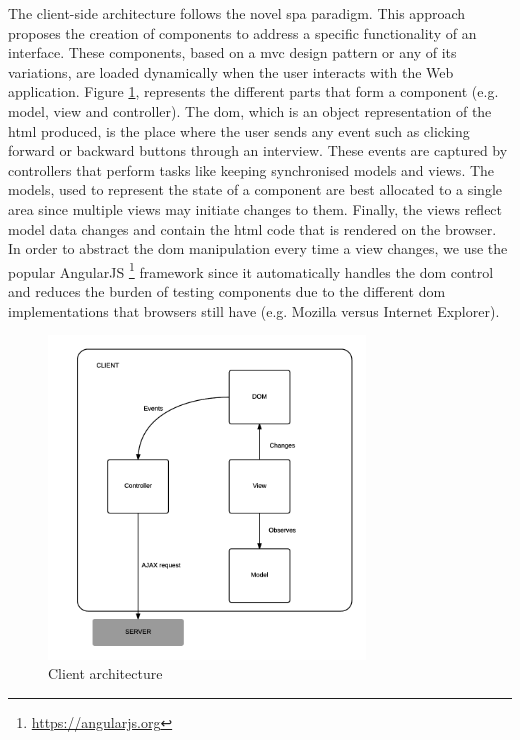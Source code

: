 	The client-side architecture follows the novel \gls{spa} paradigm. This approach proposes the creation of components to address a specific functionality of an interface. These components, based on a \gls{mvc} design pattern or any of its variations, are loaded dynamically when the user interacts with the Web application. Figure \ref{fig:design:ClientArchitecture}, represents the different parts that form a component (e.g. model, view and controller). The \gls{dom}, which is an object representation of the \gls{html} produced, is the place where the user sends any event such as clicking forward or backward buttons through an interview. These events are captured by controllers that perform tasks like keeping synchronised models and views. The models, used to represent the state of a component are best allocated to a single area since multiple views may initiate changes to them. Finally, the views reflect model data changes and contain the \gls{html} code that is rendered on the browser. In order to abstract the \gls{dom} manipulation every time a view changes, we use the popular AngularJS \footnote{\url{https://angularjs.org}} framework since it automatically handles the \gls{dom} control \cite{book:kozlowski13} and reduces the burden of testing components due to the different \gls{dom} implementations that browsers still have (e.g. Mozilla versus Internet Explorer).

	\begin{figure}[H]
	\centering
	\includegraphics[width=0.75\textwidth]{design/img/webClientArchitecture.png}
	\caption{Client architecture}
	\label{fig:design:ClientArchitecture}
	\end{figure}

